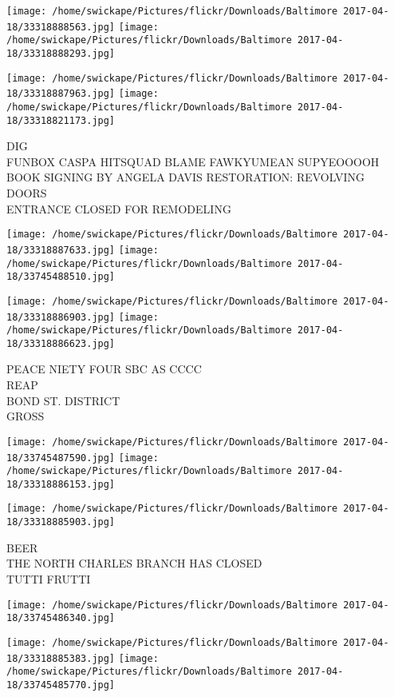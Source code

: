 \documentclass[10pt,letterpaper]{article}
\begin{document}
\texttt{[image: /home/swickape/Pictures/flickr/Downloads/Baltimore 2017-04-18/33318888563.jpg]}
\texttt{[image: /home/swickape/Pictures/flickr/Downloads/Baltimore 2017-04-18/33318888293.jpg]}

\texttt{[image: /home/swickape/Pictures/flickr/Downloads/Baltimore 2017-04-18/33318887963.jpg]}
\texttt{[image: /home/swickape/Pictures/flickr/Downloads/Baltimore 2017-04-18/33318821173.jpg]}

DIG\\
FUNBOX CASPA HITSQUAD BLAME FAWKYUMEAN SUPYEOOOOH\\
BOOK SIGNING BY ANGELA DAVIS RESTORATION: REVOLVING DOORS\\
ENTRANCE CLOSED FOR REMODELING\\
\pagebreak

\texttt{[image: /home/swickape/Pictures/flickr/Downloads/Baltimore 2017-04-18/33318887633.jpg]}
\texttt{[image: /home/swickape/Pictures/flickr/Downloads/Baltimore 2017-04-18/33745488510.jpg]}

\texttt{[image: /home/swickape/Pictures/flickr/Downloads/Baltimore 2017-04-18/33318886903.jpg]}
\texttt{[image: /home/swickape/Pictures/flickr/Downloads/Baltimore 2017-04-18/33318886623.jpg]}

PEACE NIETY FOUR SBC AS CCCC\\
REAP\\
BOND ST. DISTRICT\\
GROSS\\
\pagebreak

\texttt{[image: /home/swickape/Pictures/flickr/Downloads/Baltimore 2017-04-18/33745487590.jpg]}
\texttt{[image: /home/swickape/Pictures/flickr/Downloads/Baltimore 2017-04-18/33318886153.jpg]}

\texttt{[image: /home/swickape/Pictures/flickr/Downloads/Baltimore 2017-04-18/33318885903.jpg]}

BEER\\
THE NORTH CHARLES BRANCH HAS CLOSED\\
TUTTI FRUTTI\\
\pagebreak

\texttt{[image: /home/swickape/Pictures/flickr/Downloads/Baltimore 2017-04-18/33745486340.jpg]}

\vspace{0.25in}
\texttt{[image: /home/swickape/Pictures/flickr/Downloads/Baltimore 2017-04-18/33318885383.jpg]}
\texttt{[image: /home/swickape/Pictures/flickr/Downloads/Baltimore 2017-04-18/33745485770.jpg]}
\end{document}
